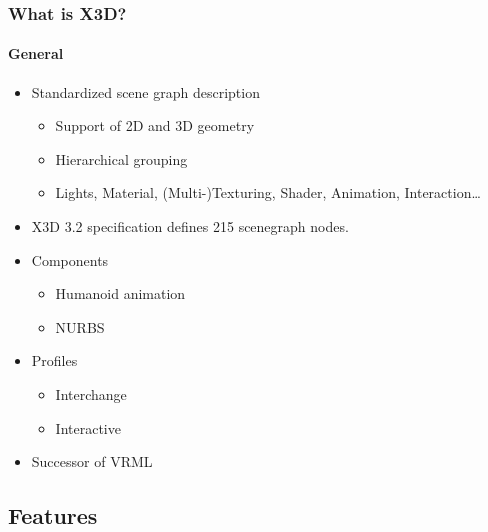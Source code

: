 \documentclass[t]{beamer}
\begin{document}
\begin{frame}[t]
\frametitle{What is X3D?}
\framesubtitle{General}
\begin{itemize}
  \item Standardized scene graph description
  \begin{itemize}
    \item Support of 2D and 3D geometry
    \item Hierarchical grouping
    \item Lights, Material, (Multi-)Texturing, Shader, Animation,
    Interaction\ldots
  \end{itemize}
  \item X3D 3.2 specification defines 215 scenegraph nodes.
  \item Components
  \begin{itemize}
    \item Humanoid animation
    \item NURBS
  \end{itemize}
  \item Profiles
  \begin{itemize}
    \item Interchange
    \item Interactive
  \end{itemize}
  \item Successor of VRML
\end{itemize}
\end{frame}

\subsection{Features}
\end{document}
